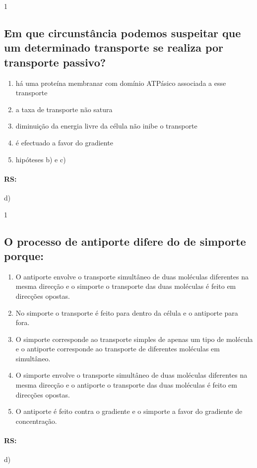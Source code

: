 \documentclass[\mainfilename]{subfiles}
\begin{document}
\begin{questionBox}1{} %

    \subsection*{Em que circunstância podemos suspeitar que um determinado transporte se realiza por transporte passivo?}

    \begin{enumerate}
        \item há uma proteína membranar com domínio ATPásico associada a esse transporte
        \item a taxa de transporte não satura
        \item diminuição da energia livre da célula não inibe o transporte 
        \item é efectuado a favor do gradiente
        \item hipóteses b) e c)
    \end{enumerate}
    
    \paragraph*{RS:} d)
    
\end{questionBox}

\begin{questionBox}1{} %
    
    \subsection*{O processo de antiporte difere do de simporte porque:}
    \begin{enumerate}[label=\alph{enumi})]
        \item O antiporte envolve o transporte simultâneo de duas moléculas diferentes na mesma direcção e o simporte o transporte das duas moléculas é feito em direcções opostas.
        \item No simporte o transporte é feito para dentro da célula e o antiporte para fora.
        \item O simporte corresponde ao transporte simples de apenas um tipo de molécula e o antiporte corresponde ao transporte de diferentes moléculas em simultâneo.
        \item O simporte envolve o transporte simultâneo de duas moléculas diferentes na mesma direcção e o antiporte o transporte das duas moléculas é feito em direcções opostas.
        \item O antiporte é feito contra o gradiente e o simporte a favor do gradiente de concentração.
    \end{enumerate}

    \paragraph*{RS:} d)
    
\end{questionBox}
\end{document}
